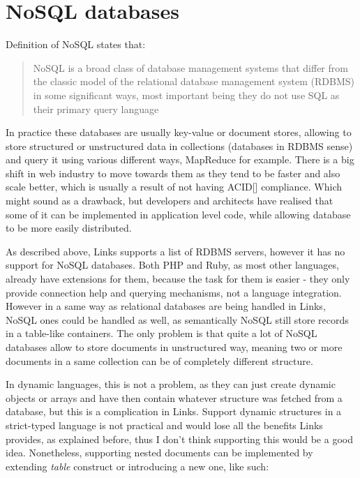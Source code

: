 \section{NoSQL databases}

Definition of NoSQL states that:

\begin{quote}
NoSQL is a broad class of database management systems that differ from the classic model of the relational database management system (RDBMS) in some significant ways, most important being they do not use SQL as their primary query language
\end{quote}

In practice these databases are usually key-value or document stores, allowing to store structured or unstructured data in collections (databases in RDBMS sense) and query it using various different ways, MapReduce for example. There is a big shift in web industry to move towards them as they tend to be faster and also scale better, which is usually a result of not having ACID[] compliance. Which might sound as a drawback, but developers and architects have realised that some of it can be implemented in application level code, while allowing database to be more easily distributed. 

As described above, Links supports a list of RDBMS servers, however it has no support for NoSQL databases. Both PHP and Ruby, as most other languages, already have extensions for them, because the task for them is easier - they only provide connection help and querying mechanisms, not a language integration. However in a same way as relational databases are being handled in Links, NoSQL ones could be handled as well, as semantically NoSQL still store records in a table-like containers. The only problem is that quite a lot of NoSQL databases allow to store documents in unstructured way, meaning two or more documents in a same collection can be of completely different structure. 

In dynamic languages, this is not a problem, as they can just create dynamic objects or arrays and have then contain whatever structure was fetched from a database, but this is a complication in Links. Support dynamic structures in a strict-typed language is not practical and would lose all the benefits Links provides, as explained before, thus I don't think supporting this would be a good idea. Nonetheless, supporting nested documents can be implemented by extending \textit{table} construct or introducing a new one, like such:

